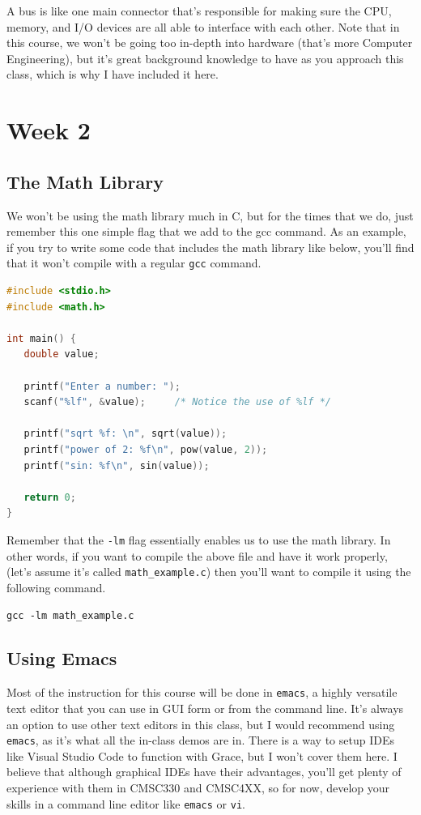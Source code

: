\documentclass[english, 10pt]{article}
\begin{document}
A bus is like one main connector that's responsible for making sure the CPU, memory, and I/O devices are all able to interface with each other.\newline\newline
Note that in this course, we won't be going too in-depth into hardware (that's more Computer Engineering), but it's great background knowledge to have as you approach this class, which is why I have included it here.

\section{Week 2}

\subsection{The Math Library}

We won't be using the math library much in C, but for the times that we do, just remember this one simple flag that we add to the gcc command. As an example, if you try to write some code that includes the math library like below, you'll find that it won't compile with a regular \texttt{gcc} command. 

{\centering
\begin{lstlisting}[language=C]
#include <stdio.h>
#include <math.h>

int main() {
   double value;

   printf("Enter a number: ");
   scanf("%lf", &value);     /* Notice the use of %lf */

   printf("sqrt %f: \n", sqrt(value));
   printf("power of 2: %f\n", pow(value, 2));
   printf("sin: %f\n", sin(value));

   return 0;
}
\end{lstlisting}
}

Remember that the \texttt{-lm} flag essentially enables us to use the math library. In other words, if you want to compile the above file and have it work properly, (let's assume it's called \texttt{math\_example.c}) then you'll want to compile it using the following command.\newline

\texttt{gcc -lm math\_example.c}

\subsection{Using Emacs}

Most of the instruction for this course will be done in \texttt{emacs}, a highly versatile text editor that you can use in GUI form or from the command line. It's always an option to use other text editors in this class, but I would recommend using \texttt{emacs}, as it's what all the in-class demos are in. There is a way to setup IDEs like Visual Studio Code to function with Grace, but I won't cover them here. I believe that although graphical IDEs have their advantages, you'll get plenty of experience with them in CMSC330 and CMSC4XX, so for now, develop your skills in a command line editor like \texttt{emacs} or \texttt{vi}.\newline
\end{document}
